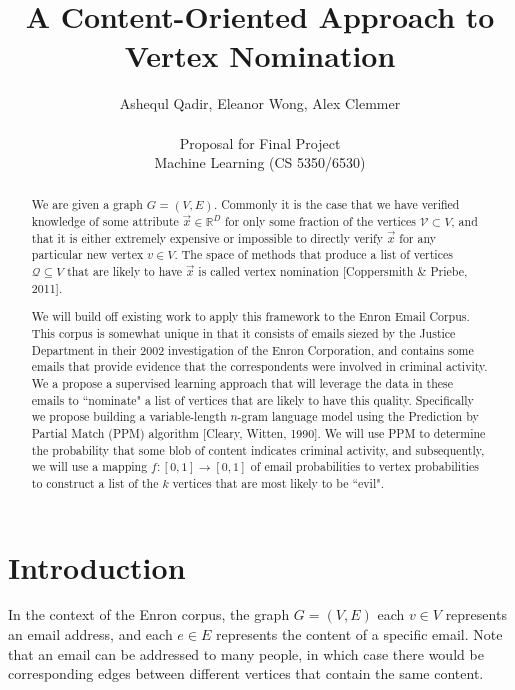 \documentclass[11pt]{article}
\title{A Content-Oriented Approach to Vertex Nomination}
\author{Ashequl Qadir, Eleanor Wong, Alex Clemmer \\\\ Proposal for Final Project \\Machine Learning (CS 5350/6530)}
\begin{document}
\lstset{language=C++,basicstyle=\small,
        stringstyle=\ttfamily,showstringspaces=false}

\singlespace
\maketitle

\begin{abstract}             %
We are given a graph $G=(V,E)$. Commonly it is the case that we have verified knowledge of some attribute $\vec{x} \in \mathbb{R}^D$ for only some fraction of the vertices $\mathcal{V} \subset V$, and that it is either extremely expensive or impossible to directly verify $\vec{x}$ for any particular new vertex $v \in V$. The space of methods that produce a list of vertices $\mathcal{Q} \subseteq V$ that are likely to have $\vec{x}$ is called vertex nomination [Coppersmith \& Priebe, 2011].

We will build off existing work to apply this framework to the Enron Email Corpus. This corpus is somewhat unique in that it consists of emails siezed by the Justice Department in their 2002 investigation of the Enron Corporation, and contains some emails that provide evidence that the correspondents were involved in criminal activity. We a propose a supervised learning approach that will leverage the data in these emails to ``nominate" a list of vertices that are likely to have this quality. Specifically we propose building a variable-length $n$-gram language model using the Prediction by Partial Match (PPM) algorithm [Cleary, Witten, 1990]. We will use PPM to determine the probability that some blob of content indicates criminal activity, and subsequently, we will use a mapping $f: [0,1] \rightarrow [0,1]$ of email probabilities to vertex probabilities to construct a list of the $k$ vertices that are most likely to be ``evil".
\end{abstract}

\section{Introduction}\label{ch:overview}
In the context of the Enron corpus, the graph $G = (V,E)$ each $v \in V$ represents an email address, and each $e \in E$ represents the content of a specific email. Note that an email can be addressed to many people, in which case there would be corresponding edges between different vertices that contain the same content.
\end{document}
